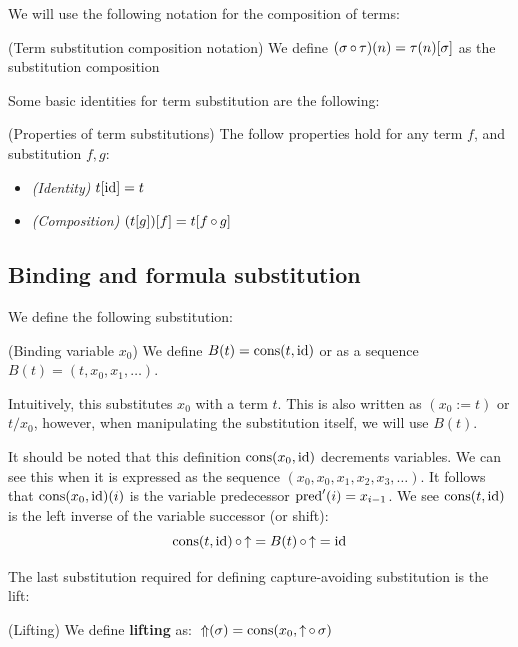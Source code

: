 We will use the following notation for the composition of terms:
\begin{cthdefinition}{(Term substitution composition notation)}
  We define \((\sigma \operatorname{\circ} \tau)(n) = \tau(n)[\sigma]\) as the substitution composition
\end{cthdefinition}

Some basic identities for term substitution are the following:
\begin{cththeorem}{(Properties of term substitutions)}
  The follow properties hold for any term $f$, and substitution $f,g$:
  \begin{itemize}[noitemsep,topsep=0pt]
  \item \emph{(Identity)} $t[\operatorname{id}] = t$
  \item \emph{(Composition)} $(t[g])[f] = t[f \operatorname{\circ} g]$
  \end{itemize}
\end{cththeorem}


\subsection{Binding and formula substitution}

We define the following substitution:

\begin{cthdefinition}{(Binding variable $x_0$)}
  We define \(B(t) = \operatorname{cons}(t,\operatorname{id})\) or as a sequence $B(t) = (t, x_0, x_1, \dots)$.

  Intuitively, this substitutes $x_0$ with a term \(t\). This is also written as \((x_0 := t)\) or \(t/x_0\), however, when manipulating the substitution itself, we will use \(B(t)\).
\end{cthdefinition}


It should be noted that this definition \(\operatorname{cons}(x_0,\operatorname{id})\) decrements variables. We can see this when it is expressed as the sequence \(( x_0, x_0, x_1, x_2, x_3, \dots )\). It follows that \(\operatorname{cons}(x_0,\operatorname{id})(i)\) is the variable predecessor \(\operatorname{pred}'(i) = x_{i - 1}\). We see \(\operatorname{cons}(t,\operatorname{id})\) is the left inverse
of the variable successor (or shift):
\[ \operatorname{cons}(t,\operatorname{id}) \operatorname{\circ} \operatorname{\uparrow} = B(t) \operatorname{\circ} \operatorname{\uparrow} = \operatorname{id} \]

The last substitution required for defining capture-avoiding substitution is the lift:
\begin{cthdefinition}{(Lifting)}
We define \textbf{lifting} as: \(\operatorname{\;\Uparrow}(\sigma) = \operatorname{cons}(x_0,\operatorname{\uparrow} \operatorname{\circ} \sigma)\)
\end{cthdefinition}

